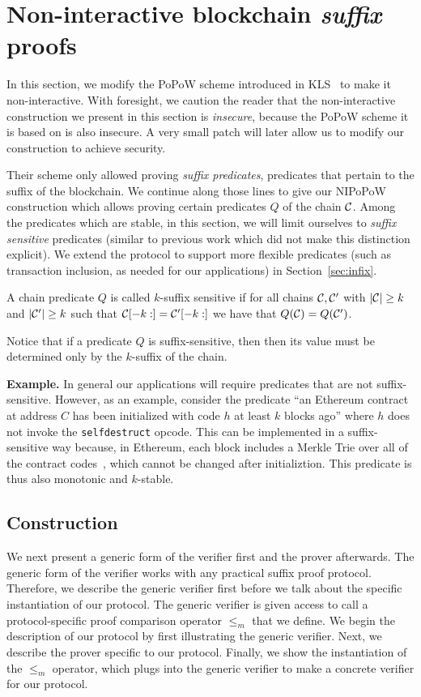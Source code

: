 \section{Non-interactive blockchain \emph{suffix} proofs}
In this section, we modify the PoPoW scheme introduced in KLS~\cite{KLS} to make
it non-interactive. With foresight, we caution the reader that the
non-interactive construction we present in this section is \emph{insecure},
because the PoPoW scheme it is based on is also insecure. A very small patch
will later allow us to modify our construction to achieve security.

Their scheme only allowed proving \emph{suffix predicates},
predicates that pertain to the suffix of the blockchain. We continue along those
lines to give our NIPoPoW construction which allows proving certain predicates
$Q$ of the chain $\mathcal{C}$. Among the predicates which are stable, in this
section, we will limit ourselves to \textit{suffix sensitive} predicates
(similar to previous work which did not make this distinction explicit). We
extend the protocol to support more flexible predicates (such as transaction
inclusion, as needed for our applications) in Section~\ref{sec:infix}.

\begin{definition}
A chain predicate $Q$ is called $k$-\textnormal{suffix sensitive} if for all
chains $\mathcal{C}, \mathcal{C}'$ with $|\mathcal{C}| \geq k$ and $|\mathcal{C}'| \geq k$ such that
$\mathcal{C}[-k:] = \mathcal{C}'[-k:]$ we have that $Q(\mathcal{C}) = Q(\mathcal{C}')$.
\end{definition}

Notice that if a predicate $Q$ is suffix-sensitive, then then its value must be
determined only by the $k$-suffix of the chain.

\noindent\textbf{Example.}
In general our applications will require predicates that are not
suffix-sensitive. However, as an example, consider the predicate ``an Ethereum
contract at address $C$ has been initialized with code $h$ at least $k$ blocks
ago'' where $h$ does not invoke the \texttt{selfdestruct} opcode. This can be
implemented in a suffix-sensitive way because, in Ethereum, each block includes
a Merkle Trie over all of the contract codes~\cite{vitalik}, which cannot be
changed after initializtion. This predicate is thus also monotonic and
$k$-stable.

\subsection{Construction}
We next present a generic form of the verifier first and the prover afterwards.
The generic form of the verifier works with any practical suffix proof protocol.
Therefore, we describe the generic verifier first before we talk about the
specific instantiation of our protocol. The generic verifier is given access to
call a protocol-specific proof comparison operator $\leq_m$ that we define. We
begin the description of our protocol by first illustrating the generic
verifier. Next, we describe the prover specific to our protocol. Finally, we
show the instantiation of the $\leq_m$ operator, which plugs into the generic
verifier to make a concrete verifier for our protocol.

